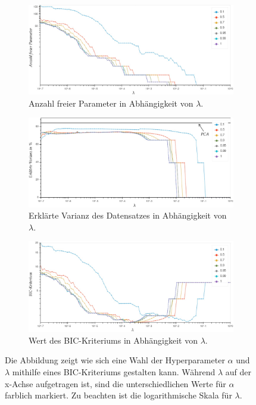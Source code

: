 \begin{figure}
\centering
\begin{subfigure}{0.9\textwidth}
\includegraphics[width=\textwidth]{figures/Signal_0_degrees_of_freedom.jpg}
\caption{Anzahl freier Parameter in Abhängigkeit von $\lambda$.}
\label{results_parameter_benchmark_degrees_of_freedom}
\vspace{0.5cm}
\end{subfigure}
\vspace{0.5cm}
%
\begin{subfigure}{0.9\textwidth}
\includegraphics[width=\textwidth]{figures/Signal_0_explained_variances.jpg}
\caption{Erklärte Varianz des Datensatzes in Abhängigkeit von $\lambda$.}
\label{results_parameter_benchmark_explained_variance}
\end{subfigure}
\vspace{0.5cm}
%
\begin{subfigure}{0.9\textwidth}
\includegraphics[width=\textwidth]{figures/Signal_0_bic.jpg}
\caption{Wert des BIC-Kriteriums in Abhängigkeit von $\lambda$.}
\label{results_parameter_benchmark_bic}
\end{subfigure}
\caption{Die Abbildung zeigt wie sich eine Wahl der Hyperparameter $\alpha$ und $\lambda$ mithilfe eines BIC-Kriteriums gestalten kann. Während $\lambda$ auf der x-Achse aufgetragen ist, sind die unterschiedlichen Werte für $\alpha$ farblich markiert. Zu beachten ist die logarithmische Skala für $\lambda$.}
\label{results_parameter_benchmark}
\end{figure}


